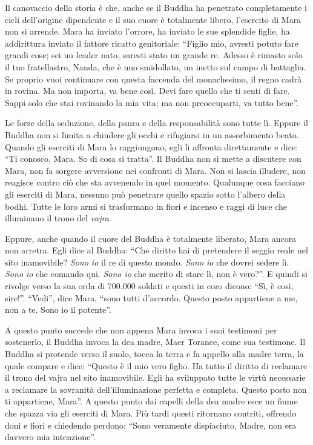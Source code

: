 Il canovaccio della storia è che, anche se il Buddha ha penetrato completamente i cicli dell'origine dipendente e il suo cuore è totalmente libero, l'esercito di Mara non si arrende. Mara ha inviato l'orrore, ha inviato le sue splendide figlie, ha addirittura inviato il fattore ricatto genitoriale: ``Figlio mio, avresti potuto fare grandi cose; sei un leader nato, saresti stato un grande re. Adesso è rimasto solo il tuo fratellastro, Nanda, che è uno smidollato, un inetto sul campo di battaglia. Se proprio vuoi continuare con questa faccenda del monachesimo, il regno cadrà in rovina. Ma non importa, va bene così. Devi fare quello che ti senti di fare. Sappi solo che stai rovinando la mia vita; ma non preoccuparti, va tutto bene''.

Le forze della seduzione, della paura e della responsabilità sono tutte lì. Eppure il Buddha non si limita a chiudere gli occhi e rifugiarsi in un assorbimento beato. Quando gli eserciti di Mara lo raggiungono, egli li affronta direttamente e dice: ``Ti conosco, Mara. So di cosa si tratta''. Il Buddha non si mette a discutere con Mara, non fa sorgere avversione nei confronti di Mara. Non si lascia illudere, non reagisce contro ciò che sta avvenendo in quel momento. Qualunque cosa facciano gli eserciti di Mara, nessuno può penetrare quello spazio sotto l'albero della bodhi. Tutte le loro armi si trasformano in fiori e incenso e raggi di luce che illuminano il trono del \textit{vajra}.

Eppure, anche quando il cuore del Buddha è totalmente liberato, Mara ancora non arretra. Egli dice al Buddha: ``Che diritto hai di pretendere il seggio reale nel sito inamovibile? \textit{Sono io} il re di questo mondo. \textit{Sono io} che dovrei sedere lì. \textit{Sono io} che comando qui. \textit{Sono io} che merito di stare lì, non è vero?''. E quindi si rivolge verso la sua orda di 700.000 soldati e questi in coro dicono: ``Sì, è così, sire!''. ``Vedi'', dice Mara, ``sono tutti d'accordo. Questo posto appartiene a me, non a te. Sono io il potente''.

A questo punto succede che non appena Mara invoca i suoi testimoni per sostenerlo, il Buddha invoca la dea madre, Maer Toranee, come sua testimone. Il Buddha si protende verso il suolo, tocca la terra e fa appello alla madre terra, la quale compare e dice: ``Questo è il mio vero figlio. Ha tutto il diritto di reclamare il trono del vajra nel sito inamovibile. Egli ha sviluppato tutte le virtù necessarie a reclamare la sovranità dell'illuminazione perfetta e completa. Questo posto non ti appartiene, Mara''. A questo punto dai capelli della dea madre esce un fiume che spazza via gli eserciti di Mara. Più tardi questi ritornano contriti, offrendo doni e fiori e chiedendo perdono: ``Sono veramente dispiaciuto, Madre, non era davvero mia intenzione''.

